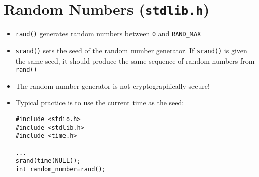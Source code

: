 \documentclass{article}
\begin{document}
\section{Random Numbers (\texttt{stdlib.h})}
\begin{itemize}
\item \texttt{rand()} generates random numbers between \texttt{0} and \texttt{RAND_MAX}
\item \texttt{srand()} sets the seed of the random number generator. If \texttt{srand()} is given the same seed, it should produce the same sequence of random numbers from \texttt{rand()}
\item The random-number generator is not cryptographically secure!
\item Typical practice is to use the current time as the seed:

\begin{verbatim}
#include <stdio.h>
#include <stdlib.h>
#include <time.h>

...
srand(time(NULL));
int random_number=rand();
\end{verbatim}
\end{itemize}
\end{document}
